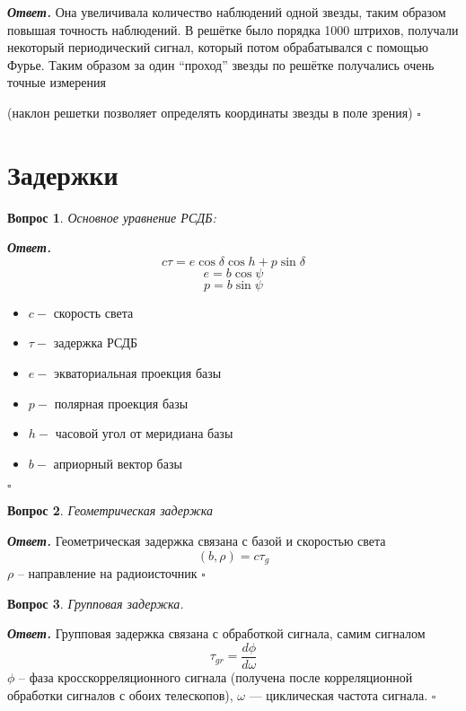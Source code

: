 \documentclass[12pt]{article}
\newtheorem{problem}{Вопрос}
\newenvironment{solution}[1][\it{Ответ}]{\textbf{#1. } }{$\square$}
\begin{document}
	\begin{solution}
		Она увеличивала количество наблюдений одной звезды, таким образом повышая точность
		наблюдений.	
		В решётке было порядка 1000 штрихов, получали некоторый периодический сигнал, который потом обрабатывался с помощью Фурье. Таким образом за один “проход” звезды по
		решётке получались очень точные измерения
		
		(наклон решетки позволяет определять координаты звезды в поле зрения)
	\end{solution}
	
	
	
\section{Задержки}
		\begin{problem}
			Основное уравнение РСДБ:
		\end{problem}
		
		\begin{solution}\\
			$$c\tau = e\cos\delta \cos h + p \sin\delta$$ $$ e = b \cos\psi $$ $$ p = b \sin\psi $$
			
			
			\begin{itemize}
				\item $c -$ скорость света
				\item $\tau -$ задержка РСДБ
				\item $e -$ экваториальная проекция базы
				\item $p -$ полярная проекция базы
				\item $h -$ часовой угол от меридиана базы
				\item $b -$ априорный вектор базы
			\end{itemize}
		\end{solution}
		
		
		\begin{problem}
			Геометрическая задержка
		\end{problem}
		
		\begin{solution}
			Геометрическая задержка связана с базой и скоростью света $$(b,\rho) = c\tau_g$$
			$\rho$ -- направление на радиоисточник
		\end{solution}
		
		
		\begin{problem}
			Групповая задержка.
		\end{problem}
		
		\begin{solution}
			Групповая задержка связана с обработкой сигнала, самим сигналом $$\tau_{gr} = \frac{d\phi}{d\omega}$$
			$\phi$ -- фаза кросскорреляционного сигнала (получена после корреляционной обработки сигналов с обоих телескопов), $\omega$ — циклическая частота сигнала.
		\end{solution}
		
\end{document}
